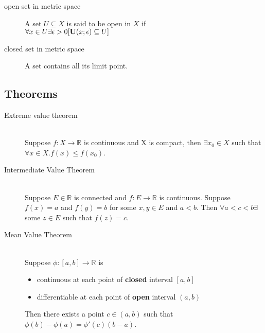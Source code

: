 \begin{description}
\item[open set in metric space]\label{def:metric:openset}
	A set $U\subseteq X$ is said to be open in $X$ if\hfill\\
		$\forall x\in U\exists \epsilon>0 [{\mathbf U}(x;\epsilon)\subseteq U]$\newline
\item[closed set in metric space]\label{def:metric:closedset}
	A set contains all its limit point.\hfill\\
\end{description}

\subsection{Theorems}
\begin{description}
\item[Extreme value theorem]\label{thm:evt}\hfill\\
	Suppose $f:X \to \mathbb{R}$ is continuous and X is compact, \newline
	then $\exists x_0 \in X$ such that $\forall x \in X. f(x) \leq f(x_0)$.
\item[Intermediate Value Theorem]\label{thm:ivt}\hfill\\
	Suppose $E \in \mathbb{R}$ is connected and $f: E \to \mathbb{R}$ is continuous. \newline
	Suppose $f(x) = a$ and $f(y) = b$ for some $x, y \in E$ and $a < b$. \newline
	Then $\forall a < c < b \exists$ some $z \in E$ such that $f(z) = c$.
\item[Mean Value Theorem]\label{thm:mvt}\hfill\\
	Suppose $\phi:[a,b]\to\mathbb{R}$ is
	\begin{itemize}
		\item continuous at each point of \textbf{closed} interval $[a, b]$
		\item differentiable at each point of \textbf{open} interval $(a, b)$
	\end{itemize}
	Then there exists a point $c \in (a,b)$ such that $\phi(b)-\phi(a) = \phi'(c)(b-a)$.
\end{description}